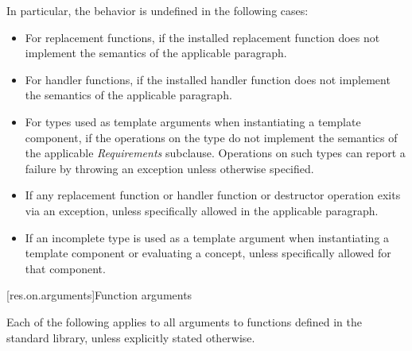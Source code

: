 \pnum
In particular, the behavior is undefined in the following cases:

\begin{itemize}
\item
For replacement functions, if the installed replacement function does not
implement the semantics of the applicable
\required
paragraph.
\item
For handler functions,
if the installed handler function does not implement the semantics of the applicable
\required
paragraph.
\item
For types used as template arguments when instantiating a template component,
if the operations on the type do not implement the semantics of the applicable
\emph{Requirements}
subclause.
Operations on such types can report a failure by throwing an exception
unless otherwise specified.
\item
If any replacement function or handler function or destructor operation exits via an exception,
unless specifically allowed
in the applicable
\required
paragraph.
\item
If an incomplete type is used as a template
argument when instantiating a template component or evaluating a concept, unless specifically
allowed for that component.
\end{itemize}

[res.on.arguments]{Function arguments}

\pnum
{}%
%
Each of the following applies to all arguments
%
to functions defined in the \Cpp{} standard library,%
unless explicitly stated otherwise.


